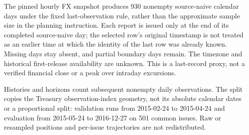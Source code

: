\documentclass[10pt,a4paper]{article}
\begin{document}
The pinned hourly FX snapshot produces 930 nonempty source-naive calendar
days under the fixed last-observation rule, rather than the approximate sample
size in the planning instruction. Each report is issued only at the end of its
completed source-naive day; the selected row's original timestamp is not treated
as an earlier time at which the identity of the last row was already known.
Missing days stay absent, and partial boundary days remain. The timezone and
historical first-release availability are unknown. This is a last-record proxy,
not a verified financial close or a peak over intraday excursions.

Histories and horizons count subsequent nonempty daily observations. The split
copies the Treasury observation-index geometry, not its absolute calendar dates
or a proportional split: validation runs from 2015-02-24 to 2015-04-24 and evaluation from
2015-05-24 to 2016-12-27 on 501 common issues. Raw or resampled positions
and per-issue trajectories are not redistributed.
\end{document}

